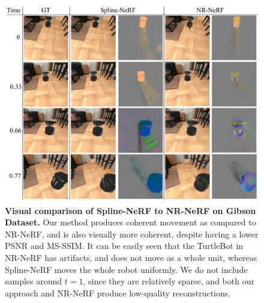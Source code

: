\begin{figure}[!ht]
    \includegraphics[width=\textwidth]{gibson_cmp}
    \caption{
        \label{fig:gib_cmp}
        \textbf{Visual comparison of Spline-NeRF to NR-NeRF on Gibson Dataset.} Our method produces coherent movement as compared to NR-NeRF, and is also visually more coherent, despite having a lower PSNR and MS-SSIM. It can be easily seen that the TurtleBot in NR-NeRF has artifacts, and does not move as a whole unit, whereas Spline-NeRF moves the whole robot uniformly. We do not include samples around $t=1$, since they are relatively sparse, and both our approach and NR-NeRF produce low-quality reconstructions.
    }
    \vspace{-6mm}
\end{figure}

